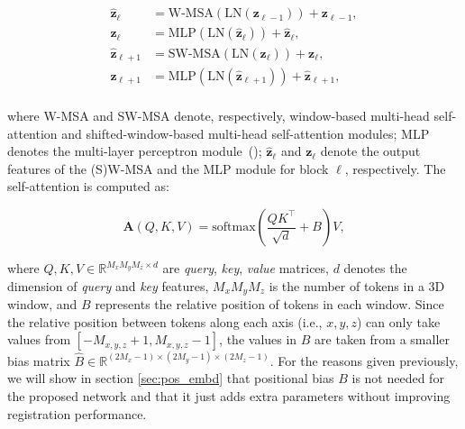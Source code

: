 \documentclass[times,twocolumn,final]{elsarticle}
\begin{document}
\begin{linenomath}
\begin{equation}
\label{eqn:sw_block}
    \begin{split}
        \hat{\mathbf{z}}_\ell &= \text{W-MSA}(\text{LN}(\mathbf{z}_{\ell-1}))+\mathbf{z}_{\ell-1},\\
        \mathbf{z}_\ell &= \text{MLP}(\text{LN}(\hat{\mathbf{z}}_\ell))+\hat{\mathbf{z}}_{\ell},\\
        \hat{\mathbf{z}}_{\ell+1} &= \text{SW-MSA}(\text{LN}(\mathbf{z}_{\ell}))+\mathbf{z}_{\ell},\\
        \mathbf{z}_{\ell+1} &= \text{MLP}(\text{LN}(\hat{\mathbf{z}}_{\ell+1}))+\hat{\mathbf{z}}_{\ell+1},\\
    \end{split}
\end{equation}
\end{linenomath}
where W-MSA and SW-MSA denote, respectively, window-based multi-head self-attention and shifted-window-based multi-head self-attention modules; MLP denotes the multi-layer perceptron module~(\cite{vaswani2017attention}); $\hat{\mathbf{z}}_\ell$ and $\mathbf{z}_\ell$ denote the output features of the (S)W-MSA and the MLP module for block $\ell$, respectively. The self-attention is computed as:
\begin{linenomath}
\begin{equation}
\label{eqn:atten}
    \mathbf{A}(Q,K,V)=\text{softmax}(\frac{QK^\top}{\sqrt{d}}+B)V,
\end{equation}
\end{linenomath}
where $Q, K, V\in\mathbb{R}^{M_xM_yM_z\times d}$ are \textit{query}, \textit{key}, \textit{value} matrices, $d$ denotes the dimension of \textit{query} and \textit{key} features, $M_xM_yM_z$ is the number of tokens in a 3D window, and $B$ represents the relative position of tokens in each window. Since the relative position between tokens along each axis (i.e., $x, y, z$) can only take values from $[-M_{x,y,z}+1, M_{x,y,z}-1]$, the values in $B$ are taken from a smaller bias matrix $\hat{B}\in\mathbb{R}^{(2M_x-1)\times(2M_y-1)\times(2M_z-1)}$. For the reasons given previously, we will show in section \ref{sec:pos_embd} that positional bias $B$ is not needed for the proposed network and that it just adds extra parameters without improving registration performance.
\end{document}

